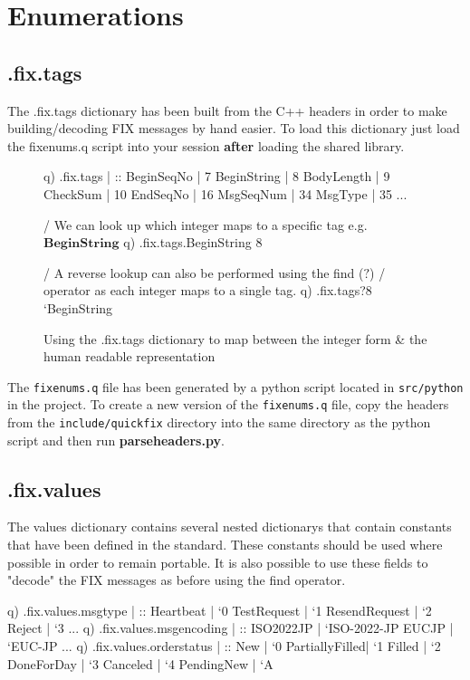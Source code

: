 \section{Enumerations}
\subsection{.fix.tags}
The .fix.tags dictionary has been built from the C++ headers in order to make building/decoding FIX messages by hand easier. To load this dictionary just load
the fixenums.q script into your session \textbf{after} loading the shared library.\\

\begin{figure}[H]
\begin{qcode}
q) .fix.tags
               | ::
BeginSeqNo     | 7
BeginString    | 8
BodyLength     | 9
CheckSum       | 10
EndSeqNo       | 16
MsgSeqNum      | 34
MsgType        | 35
...

/ We can look up which integer maps to a specific tag e.g. $\textbf{BeginString}$
q) .fix.tags.BeginString
8

/ A reverse lookup can also be performed using the find ($\textbf{?}$) 
/ operator as each integer maps to a single tag.
q) .fix.tags?8
`BeginString
\end{qcode}
\caption{Using the .fix.tags dictionary to map between the integer form \& the human readable representation}
\label{fig:tags}
\end{figure}

The \verb|fixenums.q| file has been generated by a python script located in
\verb|src/python| in the project. To create a new version of the \verb|fixenums.q| file, copy the headers from the \verb|include/quickfix| directory into the same
directory as the python script and then run \textbf{parseheaders.py}.

\subsection{.fix.values}

The values dictionary contains several nested dictionarys that contain constants that
have been defined in the standard. These constants should be used where possible in order to remain
portable. It is also possible to use these fields to "decode" the FIX messages as before using the
find operator.

\begin{qcode}
q) .fix.values.msgtype
               | ::
Heartbeat      | `0
TestRequest    | `1
ResendRequest  | `2
Reject         | `3
...
q) .fix.values.msgencoding
               | ::
ISO2022JP      | `ISO-2022-JP
EUCJP          | `EUC-JP
...
q) .fix.values.orderstatus
               | ::
New            | `0
PartiallyFilled| `1
Filled         | `2
DoneForDay     | `3
Canceled       | `4
PendingNew     | `A
\end{qcode}
